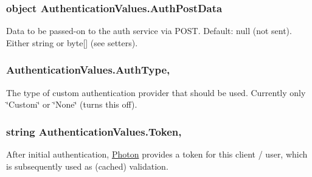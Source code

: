 \subsubsection[{\texorpdfstring{Auth\+Post\+Data}{AuthPostData}}]{\setlength{\rightskip}{0pt plus 5cm}object Authentication\+Values.\+Auth\+Post\+Data\hspace{0.3cm}{\ttfamily [get]}}\hypertarget{class_authentication_values_ae5df4bb87c20c0e83e1f13ca126a3b5f}{}\label{class_authentication_values_ae5df4bb87c20c0e83e1f13ca126a3b5f}


Data to be passed-\/on to the auth service via P\+O\+ST. Default\+: null (not sent). Either string or byte\mbox{[}\mbox{]} (see setters).

\subsubsection[{\texorpdfstring{Auth\+Type}{AuthType}}]{ Authentication\+Values.\+Auth\+Type\hspace{0.3cm}{\ttfamily [get]}, {\ttfamily [set]}}\hypertarget{class_authentication_values_a6902d22f3f59653cac4ee895273ed5c5}{}\label{class_authentication_values_a6902d22f3f59653cac4ee895273ed5c5}


The type of custom authentication provider that should be used. Currently only \char`\"{}\+Custom\char`\"{} or \char`\"{}\+None\char`\"{} (turns this off).

\subsubsection[{\texorpdfstring{Token}{Token}}]{\setlength{\rightskip}{0pt plus 5cm}string Authentication\+Values.\+Token\hspace{0.3cm}{\ttfamily [get]}, {\ttfamily [set]}}\hypertarget{class_authentication_values_a0fa90664bfe590fec56cf4f399ff26b2}{}\label{class_authentication_values_a0fa90664bfe590fec56cf4f399ff26b2}


After initial authentication, \hyperlink{namespace_photon}{Photon} provides a token for this client / user, which is subsequently used as (cached) validation.

